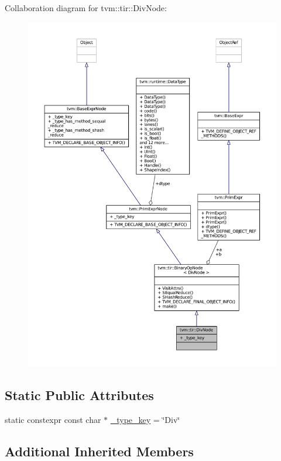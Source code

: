 Collaboration diagram for tvm\+:\+:tir\+:\+:Div\+Node\+:
\nopagebreak
\begin{figure}[H]
\begin{center}
\leavevmode
\includegraphics[width=350pt]{classtvm_1_1tir_1_1DivNode__coll__graph}
\end{center}
\end{figure}
\subsection*{Static Public Attributes}
\begin{DoxyCompactItemize}
\item 
static constexpr const char $\ast$ \hyperlink{classtvm_1_1tir_1_1DivNode_ae8bcae6203ba7f84ae2809f6295000b8}{\+\_\+type\+\_\+key} = \char`\"{}Div\char`\"{}
\end{DoxyCompactItemize}
\subsection*{Additional Inherited Members}



